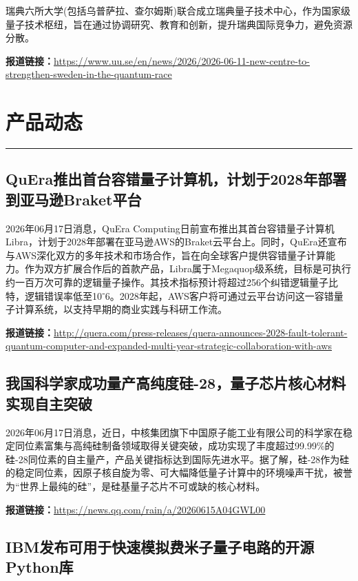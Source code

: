 \documentclass[12pt,a4paper]{ctexart}
\begin{document}
瑞典六所大学(包括乌普萨拉、查尔姆斯)联合成立瑞典量子技术中心，作为国家级量子技术枢纽，旨在通过协调研究、教育和创新，提升瑞典国际竞争力，避免资源分散。

\noindent\textbf{报道链接：}\url{https://www.uu.se/en/news/2026/2026-06-11-new-centre-to-strengthen-sweden-in-the-quantum-race}


\newpage
\section{产品动态}
\vspace{-0.5em}
\noindent\rule{\linewidth}{1.5pt}

\subsection{ QuEra推出首台容错量子计算机，计划于2028年部署到亚马逊Braket平台 }

2026年06月17日消息，QuEra Computing日前宣布推出其首台容错量子计算机Libra，计划于2028年部署在亚马逊AWS的Braket云平台上。同时，QuEra还宣布与AWS深化双方的多年技术和市场合作，旨在向全球客户提供容错量子计算能力。作为双方扩展合作后的首款产品，Libra属于Megaquop级系统，目标是可执行约一百万次可靠的逻辑量子操作。其技术指标预计将超过256个纠错逻辑量子比特，逻辑错误率低至10⁻6。2028年起，AWS客户将可通过云平台访问这一容错量子计算系统，以支持早期的商业实践与科研工作流。

\noindent\textbf{报道链接：}\url{http://quera.com/press-releases/quera-announces-2028-fault-tolerant-quantum-computer-and-expanded-multi-year-strategic-collaboration-with-aws}

\subsection{ 我国科学家成功量产高纯度硅-28，量子芯片核心材料实现自主突破 }

2026年06月17日消息，近日，中核集团旗下中国原子能工业有限公司的科学家在稳定同位素富集与高纯硅制备领域取得关键突破，成功实现了丰度超过99.99\%的硅-28同位素的自主量产，产品关键指标达到国际先进水平。据了解，硅-28作为硅的稳定同位素，因原子核自旋为零、可大幅降低量子计算中的环境噪声干扰，被誉为“世界上最纯的硅”，是硅基量子芯片不可或缺的核心材料。

\noindent\textbf{报道链接：}\url{https://news.qq.com/rain/a/20260615A04GWL00}

\subsection{ IBM发布可用于快速模拟费米子量子电路的开源Python库 }
\end{document}
